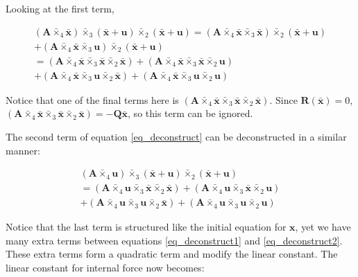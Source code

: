 \documentclass[twocolumn,10pt]{asme2ej}
\begin{document}
Looking at the first term,

\begin{equation}
  \begin{split}
(\bm{A} \bar{\times}_4 \bm{\bar{x}}) \bar{\times}_3 (\bm{\bar{x}} + \bm{u}) \bar{\times}_2 (\bm{\bar{x}}+ \bm{u})
 = (\bm{A} \bar{\times}_4 \bm{\bar{x}} \bar{\times}_3 \bm{\bar{x}} ) \bar{\times}_2 (\bm{\bar{x}}+ \bm{u})
\\ + (\bm{A} \bar{\times}_4 \bm{\bar{x}} \bar{\times}_3 \bm{u} ) \bar{\times}_2 (\bm{\bar{x}}+ \bm{u})
\\ = (\bm{A} \bar{\times}_4 \bm{\bar{x}} \bar{\times}_3 \bm{\bar{x}} \bar{\times}_2 \bm{\bar{x}})
+ (\bm{A} \bar{\times}_4 \bm{\bar{x}} \bar{\times}_3 \bm{\bar{x}} \bar{\times}_2 \bm{u})
\\ + (\bm{A} \bar{\times}_4 \bm{\bar{x}} \bar{\times}_3 \bm{u} \bar{\times}_2 \bm{\bar{x}})
+ (\bm{A} \bar{\times}_4 \bm{\bar{x}} \bar{\times}_3 \bm{u} \bar{\times}_2 \bm{u})
\label{eq_deconstruct1}
\end{split}
\end{equation}

Notice that one of the final terms here is $(\bm{A} \bar{\times}_4 \bm{\bar{x}} \bar{\times}_3 \bm{\bar{x}} \bar{\times}_2 \bm{\bar{x}})$. Since $\bm{R}(\bm{\bar{x}}) = 0$, $(\bm{A} \bar{\times}_4 \bm{\bar{x}} \bar{\times}_3 \bm{\bar{x}} \bar{\times}_2 \bm{\bar{x}}) = -\bm{Q} \bm{\bar{x}}$, so this term can be ignored.

The second term of equation \ref{eq_deconstruct} can be deconstructed in a similar manner:

\begin{multline}
(\bm{A} \bar{\times}_4 \bm{u}) \bar{\times}_3 (\bm{\bar{x}} + \bm{u}) \bar{\times}_2 (\bm{\bar{x}}+ \bm{u})
\\ = (\bm{A} \bar{\times}_4 \bm{u} \bar{\times}_3 \bm{\bar{x}} \bar{\times}_2 \bm{\bar{x}})
+ (\bm{A} \bar{\times}_4 \bm{u} \bar{\times}_3 \bm{\bar{x}} \bar{\times}_2 \bm{u})
\\ + (\bm{A} \bar{\times}_4 \bm{u} \bar{\times}_3 \bm{u} \bar{\times}_2 \bm{\bar{x}})
+ (\bm{A} \bar{\times}_4 \bm{u} \bar{\times}_3 \bm{u} \bar{\times}_2 \bm{u})
\label{eq_deconstruct2}
\end{multline}

Notice that the last term is structured like the initial equation for $\bm{x}$, yet we have many extra terms between equations \ref{eq_deconstruct1} and \ref{eq_deconstruct2}. These extra terms form a quadratic term and modify the linear constant. The linear constant for internal force now becomes:
\end{document}
